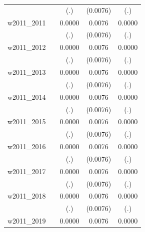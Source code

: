 \begin{table}[htbp]
\begin{tabular}{l*{4}{c}}
            &                     &         (.)         &    (0.0076)         &         (.)         \\
[1em]
w2011\_2011  &                     &      0.0000         &      0.0076         &      0.0000         \\
            &                     &         (.)         &    (0.0076)         &         (.)         \\
[1em]
w2011\_2012  &                     &      0.0000         &      0.0076         &      0.0000         \\
            &                     &         (.)         &    (0.0076)         &         (.)         \\
[1em]
w2011\_2013  &                     &      0.0000         &      0.0076         &      0.0000         \\
            &                     &         (.)         &    (0.0076)         &         (.)         \\
[1em]
w2011\_2014  &                     &      0.0000         &      0.0076         &      0.0000         \\
            &                     &         (.)         &    (0.0076)         &         (.)         \\
[1em]
w2011\_2015  &                     &      0.0000         &      0.0076         &      0.0000         \\
            &                     &         (.)         &    (0.0076)         &         (.)         \\
[1em]
w2011\_2016  &                     &      0.0000         &      0.0076         &      0.0000         \\
            &                     &         (.)         &    (0.0076)         &         (.)         \\
[1em]
w2011\_2017  &                     &      0.0000         &      0.0076         &      0.0000         \\
            &                     &         (.)         &    (0.0076)         &         (.)         \\
[1em]
w2011\_2018  &                     &      0.0000         &      0.0076         &      0.0000         \\
            &                     &         (.)         &    (0.0076)         &         (.)         \\
[1em]
w2011\_2019  &                     &      0.0000         &      0.0076         &      0.0000         \\

\end{tabular}
\end{table}
